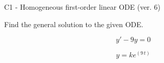 \begin{exercise}
  \begin{exerciseTitle}C1 - Homogeneous first-order linear ODE (ver. 6)\end{exerciseTitle}
  \begin{exerciseStatement}
    
Find the general solution to the given ODE.

    
\[y'-9y=0\]

  \end{exerciseStatement}
  \begin{exerciseAnswer}
    
\[y= k e^{\left(9 \, t\right)}\]

  \end{exerciseAnswer}
\end{exercise}